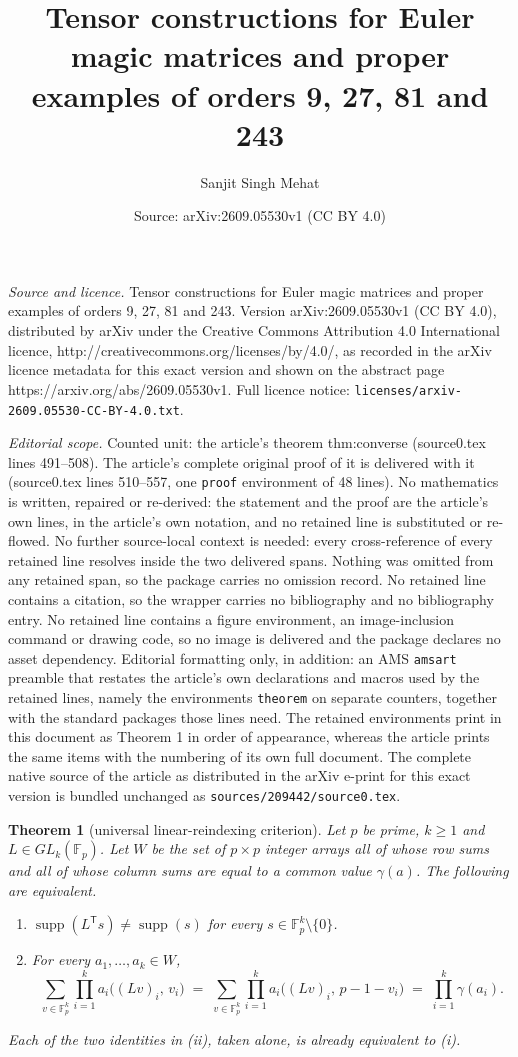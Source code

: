\documentclass[10pt,a4paper]{amsart}
\title{Tensor constructions for Euler magic matrices and proper examples of orders 9, 27, 81 and 243}
\author{Sanjit Singh Mehat}
\date{Source: arXiv:2609.05530v1 (CC BY 4.0)}
\newtheorem{theorem}{Theorem}
\newcommand{\FF}{\mathbb{F}}
\newcommand{\supp}{\operatorname{supp}}
\newcommand{\tr}{\mathsf{T}}
\begin{document}
\maketitle

\noindent\emph{Source and licence.} Tensor constructions for Euler magic matrices and proper examples of orders 9, 27, 81 and 243. Version arXiv:2609.05530v1 (CC BY 4.0), distributed by arXiv under the Creative Commons Attribution 4.0 International licence, http://creativecommons.org/licenses/by/4.0/, as recorded in the arXiv licence metadata for this exact version and shown on the abstract page https://arxiv.org/abs/2609.05530v1. Full licence notice: \texttt{licenses/arxiv-2609.05530-CC-BY-4.0.txt}.\par\smallskip

\noindent\textit{Editorial scope.} Counted unit: the article's theorem thm:converse (source0.tex lines 491--508). The article's complete original proof of it is delivered with it (source0.tex lines 510--557, one \texttt{proof} environment of 48 lines). No mathematics is written, repaired or re-derived: the statement and the proof are the article's own lines, in the article's own notation, and no retained line is substituted or re-flowed.  No further source-local context is needed: every cross-reference of every retained line resolves inside the two delivered spans.  Nothing was omitted from any retained span, so the package carries no omission record.  No retained line contains a citation, so the wrapper carries no bibliography and no bibliography entry.  No retained line contains a figure environment, an image-inclusion command or drawing code, so no image is delivered and the package declares no asset dependency.  Editorial formatting only, in addition: an AMS \texttt{amsart} preamble that restates the article's own declarations and macros used by the retained lines, namely the environments \texttt{theorem} on separate counters, together with the standard packages those lines need.  The retained environments print in this document as Theorem 1 in order of appearance, whereas the article prints the same items with the numbering of its own full document.  The complete native source of the article as distributed in the arXiv e-print for this exact version is bundled unchanged as \texttt{sources/209442/source0.tex}.
\begin{theorem}[universal linear-reindexing criterion]\label{thm:converse}
Let $p$ be prime, $k\ge1$ and $L\in GL_k(\FF_p)$. Let $W$ be the set of
$p\times p$ integer arrays all of whose row sums and all of whose column sums
are equal to a common value $\gamma(a)$. The following are equivalent.
\begin{enumerate}
\item[\textup{(i)}] $\supp(L^{\tr}s)\ne\supp(s)$ for every
  $s\in\FF_p^k\setminus\{0\}$.
\item[\textup{(ii)}] For \emph{every} $a_1,\dots,a_k\in W$,
\[
\sum_{v\in\FF_p^k}\prod_{i=1}^{k}a_i\big((Lv)_i,\,v_i\big)
\;=\;
\sum_{v\in\FF_p^k}\prod_{i=1}^{k}a_i\big((Lv)_i,\,p-1-v_i\big)
\;=\;\prod_{i=1}^{k}\gamma(a_i).
\]
\end{enumerate}
Each of the two identities in \textup{(ii)}, taken alone, is already equivalent
to \textup{(i)}.
\end{theorem}
\end{document}
